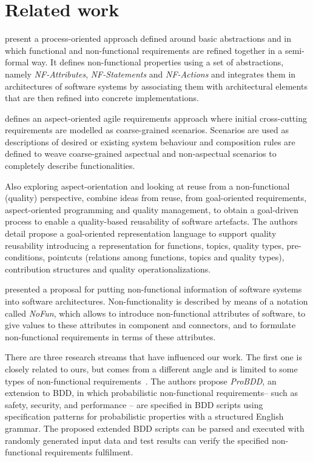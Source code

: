 \documentclass[dissertation,final]{softeng}
\newcommand{\nfrs}{non-functional requirements\xspace}
\begin{document}
\section{Related work}
\citet{Rosa2004} present a process-oriented approach defined around basic abstractions and in which functional and non-functional requirements are refined together in a semi-formal way. It defines non-functional properties using a set of abstractions, namely \emph{NF-Attributes}, \emph{NF-Statements} and \emph{NF-Actions} and integrates them in architectures of software systems by associating them with architectural elements that are then refined into concrete implementations.

\citet{Araujo2005} defines an aspect-oriented agile requirements approach where initial cross-cutting requirements are modelled as coarse-grained scenarios. Scenarios are used as descriptions of desired or existing system behaviour and composition rules are defined to weave coarse-grained aspectual and non-aspectual scenarios to completely describe functionalities.

Also exploring aspect-orientation and looking at reuse from a non-functional (quality) perspective, \citet{Leite2005} combine ideas from reuse, from goal-oriented requirements, aspect-oriented programming and quality management, to obtain a goal-driven process to enable a quality-based reusability of software artefacts. The authors detail propose a goal-oriented representation language to support quality reusability introducing a representation for functions, topics, quality types, pre-conditions, pointcuts (relations among functions, topics and quality types), contribution structures and quality operationalizations.

\cite{Franch1998} presented a proposal for putting non-functional information of software systems into software architectures. Non-functionality is described by means of a notation called \emph{NoFun}, which allows to introduce non-functional attributes of software, to give values to these attributes in component and connectors, and to formulate non-functional requirements in terms of these attributes.

There are three research streams that have influenced our work. The first one is closely related to ours, but comes from a different angle and is limited to some types of \nfrs~\citep{barmi2011automated}. The authors propose \emph{ProBDD}, an extension to BDD, in which probabilistic \nfrs -- such as safety, security, and performance -- are specified in BDD scripts using specification patterns for probabilistic properties with a structured English grammar. The proposed extended BDD scripts can be parsed and executed with randomly generated input data and test results can verify the specified \nfrs fulfilment. 
\end{document}
